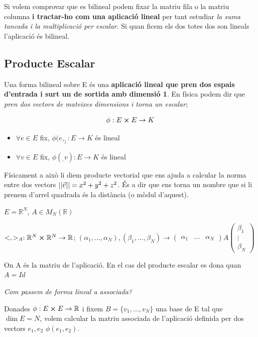 \documentclass[12pt]{article}
\newcommand{\R}{\mathbb{R}}
\begin{document}
Si volem comprovar que es bilineal podem fixar la matriu fila o la matriu columna \textbf{i tractar-ho com una aplicació lineal} per tant estudiar \textit{la suma tancada i la multiplicació per escalar}. Si quan ficem els dos totes dos son lineals l'aplicació és bilineal.

\subsection{Producte Escalar}

Una forma bilineal sobre E és una \textbf{aplicació lineal que pren dos espais d'entrada i surt un de sortida amb dimensió 1}. En física podem dir que \textit{pren dos vectors de mateixes dimensions i torna un escalar};

\[\phi: E \cross E \rightarrow K\]

\begin{itemize}
    \item $\forall e \in E$ fix, $\phi (e,_): E\rightarrow K$ és lineal
    \item $\forall v \in E$ fix, $\phi (_,v): E\rightarrow K$ és lineal
\end{itemize}

Físicament a això li diem producte vectorial que ens ajuda a calcular la norma entre dos vectors $\abs{\abs{\vec{v}}} = x^2 + y^2 + z^2$. És a dir que ens torna un nombre que si li prenem d'arrel quadrada és la distància (o mòdul d'aquest).

\noindent $E = \R^N$, $A \in M_N (\R)$

$<,>_A: \R^N \cross \R^N \rightarrow \R$;
$(\alpha_1, \dots, \alpha_N), (\beta_1, \dots, \beta_N) \rightarrow \begin{pmatrix}
   \alpha_1 & \dots & \alpha_N 
\end{pmatrix}A\begin{pmatrix}
    \beta_1\\
    \vdots\\
    \beta_N
\end{pmatrix}$

On A és la matriu de l'aplicació. En el cas del producte escalar es dona quan $A = Id$

\noindent \textit{Com passem de forma lineal a associada?}

Donades $\phi: E\cross E \rightarrow \R$ i fixem $B = \{v_1, \dots, v_N\}$ una base de E tal que $\dim E = N$, volem calcular la matriu associada de l'aplicació definida per dos vectors $e_1, e_2$ $\phi(e_1,e_2)$. 
\end{document}
